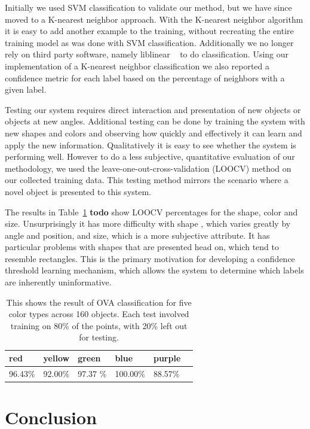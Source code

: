 \documentclass[11pt]{article}
\newcommand{\xxx}[1]{{\bf \color{red} #1}}
\newcommand\T{\rule{0pt}{3ex}}
\newcommand\B{\rule[-1.2ex]{0pt}{0pt}}
\begin{document}
Initially we used SVM classification to validate our method, but we have since 
moved to a K-nearest neighbor approach.  With the K-nearest neighbor algorithm 
it is easy to add another example to the training, without recreating the 
entire training model as was done with SVM classification.  Additionally we no 
longer rely on third party software, namely liblinear ~\cite{LIBLINEAR} to do 
classification.  Using our implementation of a K-nearest neighbor 
classification we also reported a confidence metric for each label based on the 
percentage of neighbors with a given label.

Testing our system requires direct interaction and presentation of new objects 
or objects at new angles.  Additional testing can be done by training the 
system with new shapes and colors and observing how quickly and effectively it 
can learn and apply the new information.  Qualitatively it is easy to see 
whether the system is performing well.  However to do a less subjective, 
quantitative evaluation of our methodology, we used the leave-one-out-cross-validation 
(LOOCV) method on our collected training data.  This testing method mirrors the 
scenario where a novel object is presented to this system.

The results in Table~\ref{tbl:testresults} \xxx{todo} show LOOCV percentages 
for the shape, color and size.  Unsurprisingly it has more difficulty with shape
, which varies greatly by angle and position, and size, which is a more 
subjective attribute. It has particular problems with shapes that are presented 
head on, which tend to resemble rectangles.  This is the primary motivation for 
developing a confidence threshold learning mechanism, which allows the system 
to determine which labels are inherently uninformative.


\begin{table}
\centering
\begin{tabular}{ | l | l | l | l | l | l |}
    \hline
    red &  yellow & green & blue & purple \T \B \\ \hline
    96.43\%  & 92.00\% & 97.37 \% & 100.00\% & 88.57\% \B \T \\ \hline
\end{tabular}
\caption{This shows the result of OVA classification for five color types
    across 160 objects. Each test involved training on 80\% of the points,
           with 20\% left out for testing.}
\label{tbl:testresults}
\end{table}


\section{Conclusion}




\end{document}
